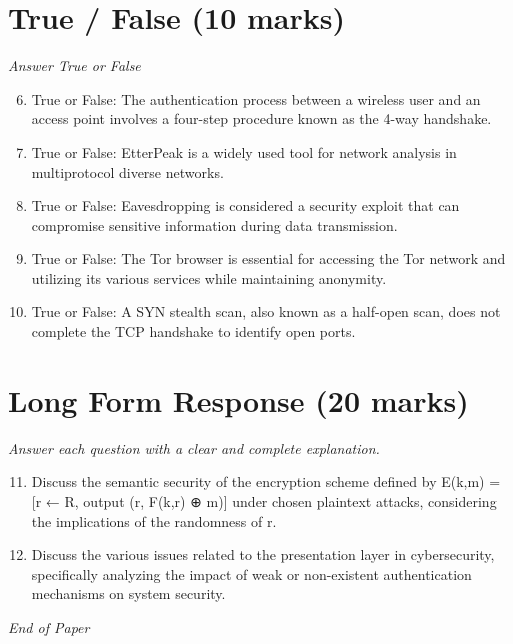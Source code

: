 \documentclass[12pt]{article}
\begin{document}
\section*{True / False (10 marks)}
\textit{Answer True or False}
\begin{enumerate}[label=\arabic*.]
\setcounter{enumi}{5}
\item True or False: The authentication process between a wireless user and an access point involves a four-step procedure known as the 4-way handshake.
\item True or False: EtterPeak is a widely used tool for network analysis in multiprotocol diverse networks.
\item True or False: Eavesdropping is considered a security exploit that can compromise sensitive information during data transmission.
\item True or False: The Tor browser is essential for accessing the Tor network and utilizing its various services while maintaining anonymity.
\item True or False: A SYN stealth scan, also known as a half-open scan, does not complete the TCP handshake to identify open ports.
\end{enumerate}

\section*{Long Form Response (20 marks)}
\textit{Answer each question with a clear and complete explanation.}
\begin{enumerate}[label=\arabic*.]
\setcounter{enumi}{10}
\item Discuss the semantic security of the encryption scheme defined by E(k,m) = [r ← R, output (r, F(k,r) ⊕ m)] under chosen plaintext attacks, considering the implications of the randomness of r.
\item Discuss the various issues related to the presentation layer in cybersecurity, specifically analyzing the impact of weak or non-existent authentication mechanisms on system security.
\end{enumerate}

\vfill
\noindent\textit{End of Paper}
\end{document}
